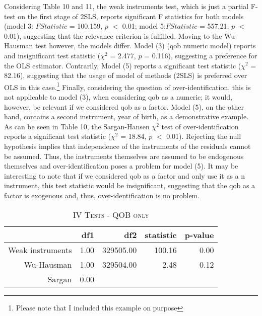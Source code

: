 \documentclass[a4paper]{article}
\begin{document}
\indent Considering Table 10 and 11, the weak instruments test, which is just a partial F-test on the first stage of 2SLS, reports significant F statistics for both models (model 3: $F Statistic$ = 100.159, $p$ $<$ 0.01; model 5:$F Statistic$ = 557.21, $p$ $<$ 0.01), suggesting that the relevance criterion is fulfilled. Moving to the Wu-Hausman test however, the models differ. Model (3) (qob numeric model) reports and insignificant test statistic (${\chi}^2$ = 2.477, $p$ = 0.116), suggesting a preference for the OLS estimator. Contrarily, Model (5) reports a significant test statistic (${\chi}^2$ = 82.16), suggesting that the usage of model of methods (2SLS) is preferred over OLS in this case.\footnote{Please note that I included this example on purpose} Finally, considering the question of over-identification, this is not applicable to model (3), when considering qob as a numeric; it would, however, be relevant if we considered qob as a factor. Model (5), on the other hand, contains a second instrument, year of birth, as a demonstrative example. As can be seen in Table 10, the Sargan-Hansen ${\chi}^2$ test of over-identification reports a significant test statistic (${\chi}^2$ = 18.84, $p$ $<$ 0.01). Rejecting the null hypothesis implies that independence of the instruments of the residuals cannot be assumed. Thus, the instruments themselves are assumed to be endogenous themselves and over-identification poses a problem for model (5). It may be interesting to note that if we considered qob as a factor and only use it as a n instrument, this test statistic would be insignificant, suggesting that the qob as a factor is exogenous and, thus, over-identification is no problem. 



\begin{table}[ht]
\captionsetup{font=small, justification=centering,singlelinecheck=false}
\caption{\textsc{IV Tests - QOB only}}
\centering
\begin{tabular}{rrrrr}
  \hline
 & df1 & df2 & statistic & p-value \\ 
  \hline
Weak instruments & 1.00 & 329505.00 & 100.16 & 0.00 \\ 
  Wu-Hausman & 1.00 & 329504.00 & 2.48 & 0.12 \\ 
  Sargan & 0.00 &  &  &  \\ 
   \hline
\end{tabular}
\end{table}
\end{document}
